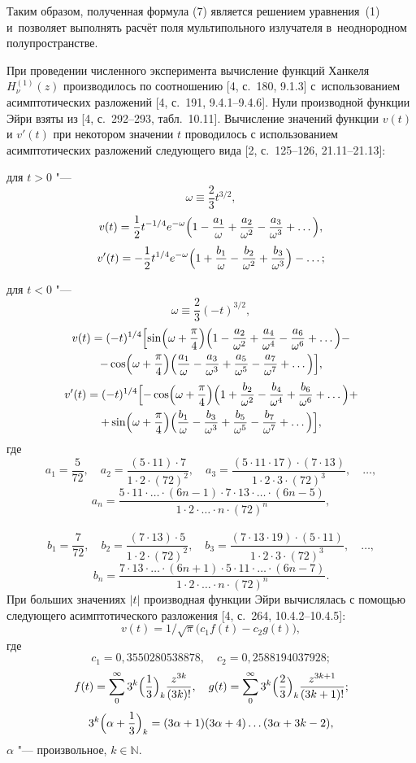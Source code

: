 Таким образом,  полученная формула (7) является решением уравнения~(1) и~позволяет выполнять расчёт поля мультипольного излучателя
в~неоднородном полупространстве.

При проведении численного
эксперимента вычисление функций Ханкеля $H_{\nu}^{(1)}(z)$
производилось по соотношению [4,  с.~180,  9.1.3] с~использованием
асимптотических разложений [4,  с.~191,  9.4.1--9.4.6].
Нули производной функции Эйри взяты из [4,  с.~292--293,  табл.~10.11].
Вычисление значений функции $v(t)$ и $v'(t)$ при некотором
значении $t$ проводилось с использованием асимптотических разложений следующего
вида [2,  с.~125--126,  21.11--21.13]:

для $t>0$ "---  $$\omega\equiv\frac 23t^{3/2},$$
$$v(t)=\frac{1}{2}t^{-1/4}e^{-\omega}\Bigl(1-\frac{a_{1}}{\omega}+\frac{a_{2}}{\omega^{2}}-\frac{a_{3}}{\omega^{3}}+\dots\Bigr),$$
$$v'(t)=-\frac{1}{2}t^{1/4}e^{-\omega}\Bigl(1+\frac{b_{1}}{\omega}-\frac{b_{2}}{\omega^{2}}+\frac{b_{3}}{\omega^{3}}\Bigr)-\dots;$$


для $t<0$ "---  $$\omega\equiv\frac 23(-t)^{3/2},$$
\begin{multline*}
 v(t)=(-t)^{1/4}\Bigl[\sin\Bigl(\omega+\frac{\pi}{4}\Bigr)\Bigl(1-\frac{a_{2}}{\omega^{2}}+\frac{a_{4}}{\omega^{4}}-\frac{a_{6}}{\omega^{6}}+\dots\Bigr)-
\\
-
\cos\Bigl(\omega+\frac{\pi}{4}\Bigr)\Bigl(\frac{a_{1}}{\omega}-\frac{a_{3}}{\omega^{3}}+\frac{a_{5}}{\omega^{5}}-\frac{a_{7}}{\omega^{7}}+\dots\Bigr)\Bigr],
\end{multline*}
\begin{multline*}
 v'(t)=(-t)^{1/4}\Bigl[-\cos\Bigl(\omega+\frac{\pi}{4}\Bigr)\Bigl(1+\frac{b_{2}}{\omega^{2}}-\frac{b_{4}}{\omega^{4}}+\frac{b_{6}}{\omega^{6}}+\dots\Bigr)+
\\
+
\sin\Bigl(\omega+\frac{\pi}{4}\Bigr)\Bigl(\frac{b_{1}}{\omega}-\frac{b_{3}}{\omega^{3}}+\frac{b_{5}}{\omega^{5}}-\frac{b_{7}}{\omega^{7}}+\dots\Bigr)\Bigr],
\end{multline*}
где
$$a_{1}=\frac{5}{72},\quad
a_{2}=\frac{(5\cdot11)\cdot7}{1\cdot2\cdot(72)^{2}},\quad
a_{3}=\frac{(5\cdot11\cdot17)\cdot(7\cdot13)}{1\cdot2\cdot3\cdot(72)^{3}},\quad
\dots,$$ $$
a_{n}=\frac{5\cdot11\cdot\dots\cdot(6n-1)\cdot7\cdot13\cdot\dots\cdot(6n-5)}{1\cdot2\cdot\dots\cdot
n\cdot(72)^{n}},$$ \\
$$b_{1}=\frac{7}{72},\quad
b_{2}=\frac{(7\cdot13)\cdot5}{1\cdot2\cdot(72)^{2}},\quad
b_{3}=\frac{(7\cdot13\cdot19)\cdot(5\cdot11)}{1\cdot2\cdot3\cdot(72)^{3}},\quad
\dots,$$
$$b_{n}=\frac{7\cdot13\cdot\dots\cdot(6n+1)\cdot5\cdot11\cdot\dots\cdot(6n-7)}{1\cdot2\cdot\dots\cdot
n\cdot(72)^{n}}.
$$
При больших значениях $|t|$
производная функции Эйри вычислялась с помощью следующего
асимптотического разложения [4,  с.~264, 10.4.2--10.4.5]:
$$v(t)=1/\sqrt{\pi}\bigl(c_{1}f(t)-c_{2}g(t)\bigr),$$
где
$$c_{1}=0,3550280538878,\quad  c_{2}=0,2588194037928;$$
$$f(t)=\sum \limits_{0}^{\infty}3^{k}\Bigl(\frac{1}{3}\Bigr)_{k}\frac{z^{3k}}{(3k)!},\quad
g(t)=\sum \limits_{0}^{\infty}3^{k}\Bigl(\frac{2}{3}\Bigr)_{k}\frac{z^{3k+1}}{(3k+1)!};$$
$$3^{k}\Bigl(\alpha+\frac{1}{3}\Bigr)_{k}=(3\alpha+1)(3\alpha+4)\dots(3\alpha+3k-2),$$
$\alpha$  "---  произвольное,  $k\in \mathbb N$.

